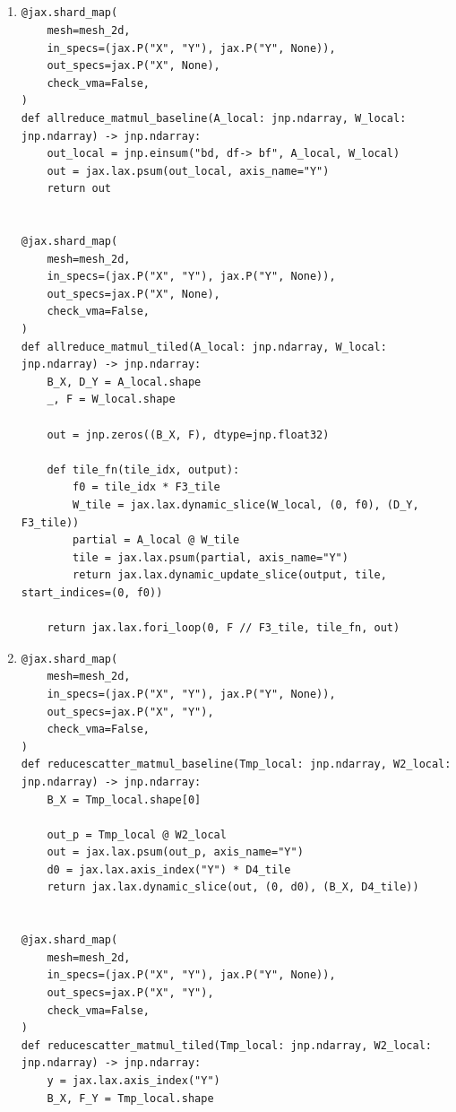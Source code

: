 \documentclass[11pt]{article}
\begin{document}
\subsection{}
\begin{enumerate}
  \item
\begin{lstlisting}[style=pythoncode]
@jax.shard_map(
    mesh=mesh_2d,
    in_specs=(jax.P("X", "Y"), jax.P("Y", None)),
    out_specs=jax.P("X", None),
    check_vma=False,
)
def allreduce_matmul_baseline(A_local: jnp.ndarray, W_local: jnp.ndarray) -> jnp.ndarray:
    out_local = jnp.einsum("bd, df-> bf", A_local, W_local)
    out = jax.lax.psum(out_local, axis_name="Y")
    return out


@jax.shard_map(
    mesh=mesh_2d,
    in_specs=(jax.P("X", "Y"), jax.P("Y", None)),
    out_specs=jax.P("X", None),
    check_vma=False,
)
def allreduce_matmul_tiled(A_local: jnp.ndarray, W_local: jnp.ndarray) -> jnp.ndarray:
    B_X, D_Y = A_local.shape
    _, F = W_local.shape

    out = jnp.zeros((B_X, F), dtype=jnp.float32)

    def tile_fn(tile_idx, output):
        f0 = tile_idx * F3_tile
        W_tile = jax.lax.dynamic_slice(W_local, (0, f0), (D_Y, F3_tile))
        partial = A_local @ W_tile
        tile = jax.lax.psum(partial, axis_name="Y")
        return jax.lax.dynamic_update_slice(output, tile, start_indices=(0, f0))

    return jax.lax.fori_loop(0, F // F3_tile, tile_fn, out)
\end{lstlisting}

  \item
\begin{lstlisting}[style=pythoncode]
@jax.shard_map(
    mesh=mesh_2d,
    in_specs=(jax.P("X", "Y"), jax.P("Y", None)),
    out_specs=jax.P("X", "Y"),
    check_vma=False,
)
def reducescatter_matmul_baseline(Tmp_local: jnp.ndarray, W2_local: jnp.ndarray) -> jnp.ndarray:
    B_X = Tmp_local.shape[0]

    out_p = Tmp_local @ W2_local
    out = jax.lax.psum(out_p, axis_name="Y")
    d0 = jax.lax.axis_index("Y") * D4_tile
    return jax.lax.dynamic_slice(out, (0, d0), (B_X, D4_tile))


@jax.shard_map(
    mesh=mesh_2d,
    in_specs=(jax.P("X", "Y"), jax.P("Y", None)),
    out_specs=jax.P("X", "Y"),
    check_vma=False,
)
def reducescatter_matmul_tiled(Tmp_local: jnp.ndarray, W2_local: jnp.ndarray) -> jnp.ndarray:
    y = jax.lax.axis_index("Y")
    B_X, F_Y = Tmp_local.shape


\end{lstlisting}
\end{enumerate}
\end{document}

